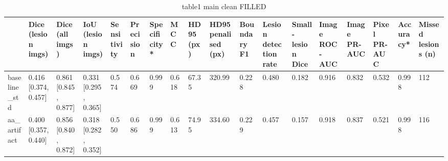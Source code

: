 \begin{table}
\caption{table1 main clean FILLED}
\label{tab:table1_main_clean_FILLED}
\begin{tabular}{llllllllllllllllll}
\toprule
 & Dice (lesion imgs) & Dice (all imgs) & IoU (lesion imgs) & Sensitivity & Precision & Specificity* & MCC & HD95 (px) & HD95 penalised (px) & Boundary F1 & Lesion detection rate & Small-lesion Dice & Image ROC-AUC & Image PR-AUC & Pixel PR-AUC & Accuracy* & Missed lesions (n) \\
\midrule
baseline\_std & 0.416 [0.374, 0.457] & 0.861 [0.845, 0.877] & 0.331 [0.295, 0.365] & 0.574 & 0.669 & 0.999 & 0.618 & 67.35 & 320.99 & 0.228 & 0.480 & 0.182 & 0.916 & 0.832 & 0.532 & 0.998 & 112 \\
aa\_artifact & 0.400 [0.357, 0.440] & 0.856 [0.840, 0.872] & 0.318 [0.282, 0.352] & 0.550 & 0.686 & 0.999 & 0.613 & 74.95 & 334.60 & 0.229 & 0.457 & 0.157 & 0.918 & 0.837 & 0.521 & 0.998 & 116 \\
\bottomrule
\end{tabular}
\end{table}
